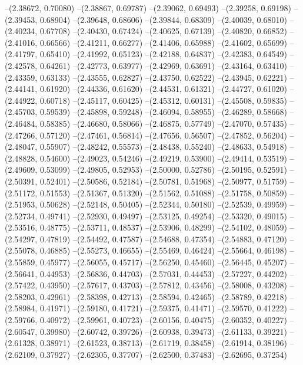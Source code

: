--(2.38672, 0.70080)
--(2.38867, 0.69787)
--(2.39062, 0.69493)
--(2.39258, 0.69198)
--(2.39453, 0.68904)
--(2.39648, 0.68606)
--(2.39844, 0.68309)
--(2.40039, 0.68010)
--(2.40234, 0.67708)
--(2.40430, 0.67424)
--(2.40625, 0.67139)
--(2.40820, 0.66852)
--(2.41016, 0.66566)
--(2.41211, 0.66277)
--(2.41406, 0.65988)
--(2.41602, 0.65699)
--(2.41797, 0.65410)
--(2.41992, 0.65123)
--(2.42188, 0.64837)
--(2.42383, 0.64549)
--(2.42578, 0.64261)
--(2.42773, 0.63977)
--(2.42969, 0.63691)
--(2.43164, 0.63410)
--(2.43359, 0.63133)
--(2.43555, 0.62827)
--(2.43750, 0.62522)
--(2.43945, 0.62221)
--(2.44141, 0.61920)
--(2.44336, 0.61620)
--(2.44531, 0.61321)
--(2.44727, 0.61020)
--(2.44922, 0.60718)
--(2.45117, 0.60425)
--(2.45312, 0.60131)
--(2.45508, 0.59835)
--(2.45703, 0.59539)
--(2.45898, 0.59248)
--(2.46094, 0.58955)
--(2.46289, 0.58668)
--(2.46484, 0.58385)
--(2.46680, 0.58066)
--(2.46875, 0.57749)
--(2.47070, 0.57435)
--(2.47266, 0.57120)
--(2.47461, 0.56814)
--(2.47656, 0.56507)
--(2.47852, 0.56204)
--(2.48047, 0.55907)
--(2.48242, 0.55573)
--(2.48438, 0.55240)
--(2.48633, 0.54918)
--(2.48828, 0.54600)
--(2.49023, 0.54246)
--(2.49219, 0.53900)
--(2.49414, 0.53519)
--(2.49609, 0.53099)
--(2.49805, 0.52953)
--(2.50000, 0.52786)
--(2.50195, 0.52591)
--(2.50391, 0.52401)
--(2.50586, 0.52184)
--(2.50781, 0.51968)
--(2.50977, 0.51759)
--(2.51172, 0.51553)
--(2.51367, 0.51320)
--(2.51562, 0.51088)
--(2.51758, 0.50859)
--(2.51953, 0.50628)
--(2.52148, 0.50405)
--(2.52344, 0.50180)
--(2.52539, 0.49959)
--(2.52734, 0.49741)
--(2.52930, 0.49497)
--(2.53125, 0.49254)
--(2.53320, 0.49015)
--(2.53516, 0.48775)
--(2.53711, 0.48537)
--(2.53906, 0.48299)
--(2.54102, 0.48059)
--(2.54297, 0.47819)
--(2.54492, 0.47587)
--(2.54688, 0.47354)
--(2.54883, 0.47120)
--(2.55078, 0.46885)
--(2.55273, 0.46655)
--(2.55469, 0.46424)
--(2.55664, 0.46198)
--(2.55859, 0.45977)
--(2.56055, 0.45717)
--(2.56250, 0.45460)
--(2.56445, 0.45207)
--(2.56641, 0.44953)
--(2.56836, 0.44703)
--(2.57031, 0.44453)
--(2.57227, 0.44202)
--(2.57422, 0.43950)
--(2.57617, 0.43703)
--(2.57812, 0.43456)
--(2.58008, 0.43208)
--(2.58203, 0.42961)
--(2.58398, 0.42713)
--(2.58594, 0.42465)
--(2.58789, 0.42218)
--(2.58984, 0.41971)
--(2.59180, 0.41721)
--(2.59375, 0.41471)
--(2.59570, 0.41222)
--(2.59766, 0.40972)
--(2.59961, 0.40723)
--(2.60156, 0.40475)
--(2.60352, 0.40227)
--(2.60547, 0.39980)
--(2.60742, 0.39726)
--(2.60938, 0.39473)
--(2.61133, 0.39221)
--(2.61328, 0.38971)
--(2.61523, 0.38713)
--(2.61719, 0.38458)
--(2.61914, 0.38196)
--(2.62109, 0.37927)
--(2.62305, 0.37707)
--(2.62500, 0.37483)
--(2.62695, 0.37254)
